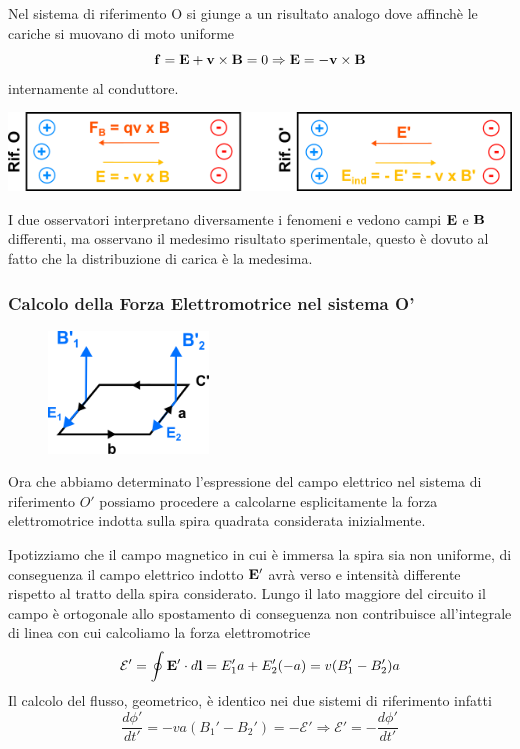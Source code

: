 Nel sistema di riferimento O si giunge a un risultato analogo dove affinch\`e le cariche si muovano di moto uniforme 
\begin{equation*}
	\bold{f} = \bold{E} + \bold{v} \times \bold{B} = 0 \Rightarrow \bold{E} = -\bold{v} \times \bold{B}
\end{equation*}
internamente al conduttore.
\begin{center}
	\includegraphics[width = 15cm]{images/riferiment.png}
\end{center}
I due osservatori interpretano diversamente i fenomeni e vedono campi $\bold{E}$ e $\bold{B}$ differenti, ma osservano il medesimo risultato sperimentale, questo \`e dovuto al fatto che la distribuzione di carica \`e la medesima.

\subsubsection{Calcolo della Forza Elettromotrice nel sistema O'}

\begin{figure}  %
    \centering
    \includegraphics[width=0.38\textwidth]{images/move_charge} %
\end{figure}

Ora che abbiamo determinato l'espressione del campo elettrico nel sistema di riferimento $O'$ possiamo procedere a calcolarne esplicitamente la forza elettromotrice indotta sulla spira quadrata considerata inizialmente.

Ipotizziamo che il campo magnetico in cui \`e immersa la spira sia non uniforme, di conseguenza il campo elettrico indotto $\bold{E}'$ avr\`a  verso e intensit\`a  differente rispetto al tratto della spira considerato. Lungo il lato maggiore del circuito il campo \`e ortogonale allo spostamento di conseguenza non contribuisce all'integrale di linea con cui calcoliamo la forza elettromotrice 
\begin{equation*}
	\mathcal{E}' = \oint \bold{E}' \cdot d\bold{l} = E_1'a  + E_2'(-a) = v(B_1' - B_2')a
\end{equation*}
Il calcolo del flusso, geometrico, \`e identico nei due sistemi di riferimento infatti 
\begin{equation*}
	\frac{d \phi '}{dt'} = - va(B_1'-B_2') = - \mathcal{E}' \Rightarrow \mathcal{E}' = - \frac{d\phi'}{dt'}
\end{equation*} 


